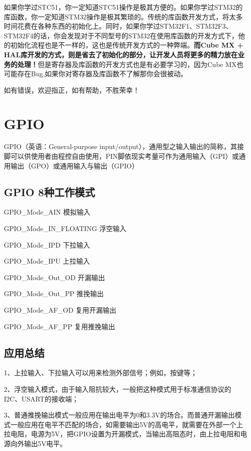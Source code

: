 \documentclass[cn,11pt]{elegantbook}
\begin{document}
如果你学过STC51，你一定知道STC51操作是极其方便的。如果你学过STM32的库函数，你一定知道STM32操作是极其繁琐的。传统的库函数开发方式，将太多时间花费在各种东西的初始化上。同时，如果你学过STM32F1、STM32F3、STM32F4的话，你会发现对于不同型号的STM32在使用库函数的开发方式下，他的初始化流程也是不一样的，这也是传统开发方式的一种弊端。\textbf{而Cube MX + HAL库开发的方式，则是省去了初始化的部分，让开发人员将更多的精力放在业务的处理！}但是寄存器及库函数的开发方式也是有必要学习的，因为Cube MX也可能存在Bug,如果你对寄存器及库函数不了解那你会很被动。


如有错误，欢迎指正，如有帮助，不胜荣幸！

\section{GPIO}

GPIO（英语：General-purpose input/output），通用型之输入输出的简称，其接脚可以供使用者由程控自由使用，PIN脚依现实考量可作为通用输入（GPI）或通用输出（GPO）或通用输入与输出（GPIO）

\subsection{GPIO 8种工作模式}

GPIO\_Mode\_AIN 模拟输入

GPIO\_Mode\_IN\_FLOATING 浮空输入

GPIO\_Mode\_IPD 下拉输入

GPIO\_Mode\_IPU 上拉输入

GPIO\_Mode\_Out\_OD 开漏输出

GPIO\_Mode\_Out\_PP 推挽输出

GPIO\_Mode\_AF\_OD 复用开漏输出

GPIO\_Mode\_AF\_PP 复用推挽输出


\subsection{应用总结}

1、上拉输入、下拉输入可以用来检测外部信号；例如，按键等；

2、浮空输入模式，由于输入阻抗较大，一般把这种模式用于标准通信协议的I2C、USART的接收端；

3、普通推挽输出模式一般应用在输出电平为0和3.3V的场合。而普通开漏输出模式一般应用在电平不匹配的场合，如需要输出5V的高电平，就需要在外部一个上拉电阻，电源为5V，把GPIO设置为开漏模式，当输出高阻态时，由上拉电阻和电源向外输出5V电平。
\end{document}
